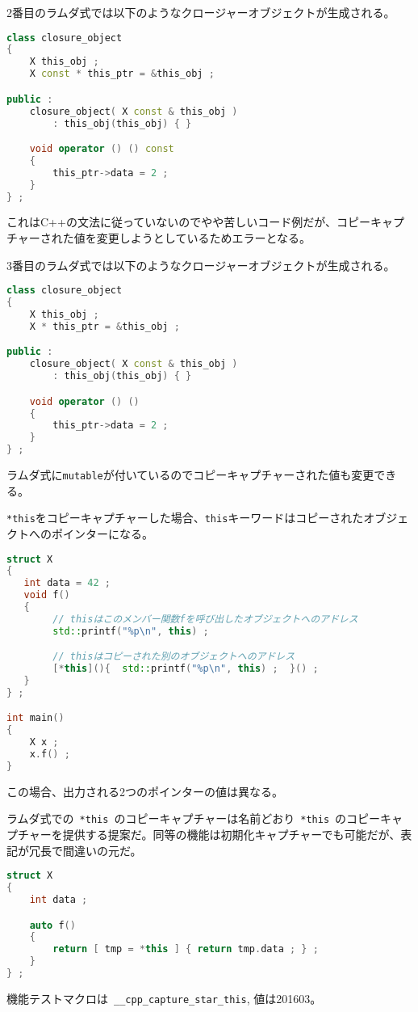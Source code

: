 2番目のラムダ式では以下のようなクロージャーオブジェクトが生成される。

\begin{lstlisting}[language=C++]
class closure_object
{
    X this_obj ;
    X const * this_ptr = &this_obj ;

public :
    closure_object( X const & this_obj )
        : this_obj(this_obj) { }

    void operator () () const
    {
        this_ptr->data = 2 ;
    }
} ;
\end{lstlisting}

これはC++の文法に従っていないのでやや苦しいコード例だが、コピーキャプチャーされた値を変更しようとしているためエラーとなる。

3番目のラムダ式では以下のようなクロージャーオブジェクトが生成される。

\begin{lstlisting}[language=C++]
class closure_object
{
    X this_obj ;
    X * this_ptr = &this_obj ;

public :
    closure_object( X const & this_obj )
        : this_obj(this_obj) { }

    void operator () ()
    {
        this_ptr->data = 2 ;
    }
} ;
\end{lstlisting}

ラムダ式に\lstinline!mutable!が付いているのでコピーキャプチャーされた値も変更できる。

\lstinline!*this!をコピーキャプチャーした場合、\lstinline!this!キーワードはコピーされたオブジェクトへのポインターになる。

\begin{lstlisting}[language=C++]
struct X
{
   int data = 42 ;
   void f()
   {
        // thisはこのメンバー関数fを呼び出したオブジェクトへのアドレス
        std::printf("%p\n", this) ;

        // thisはコピーされた別のオブジェクトへのアドレス
        [*this](){  std::printf("%p\n", this) ;  }() ;
   }
} ;

int main()
{
    X x ;
    x.f() ;
}
\end{lstlisting}

この場合、出力される2つのポインターの値は異なる。

ラムダ式での~\lstinline!*this!~のコピーキャプチャーは名前どおり~\lstinline!*this!~のコピーキャプチャーを提供する提案だ。同等の機能は初期化キャプチャーでも可能だが、表記が冗長で間違いの元だ。

\begin{lstlisting}[language=C++]
struct X
{
    int data ;

    auto f()
    {
        return [ tmp = *this ] { return tmp.data ; } ;
    }
} ;
\end{lstlisting}

機能テストマクロは~\lstinline!__cpp_capture_star_this!, 値は201603。
